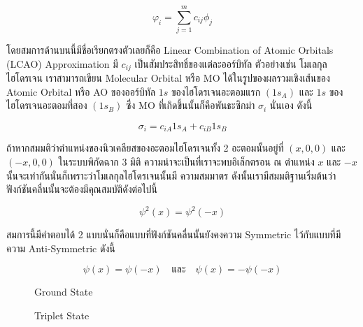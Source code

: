 \begin{equation}
  \label{eq:LCAO}
  \varphi_i = \sum_{j=1}^m c_{i j} \phi_j
\end{equation}

\noindent โดยสมการด้านบนนี้มีชื่อเรียกตรงตัวเลยก็คือ Linear Combination of Atomic Orbitals (LCAO) Approximation
มี $c_{i j}$ เป็นสัมประสิทธิ์ของแต่ละออร์บิทัล ตัวอย่างเช่น โมเลกุลไฮโดรเจน  เราสามารถเขียน Molecular Orbital หรือ MO
ได้ในรูปของผลรวมเชิงเส้นของ Atomic Orbital หรือ AO ของออร์บิทัล $1 s$ ของไฮโดรเจนอะตอมแรก $(1 s_A)$ และ $1 s$
ของไฮโดรเจนอะตอมที่สอง $(1 s_B)$ ซึ่ง MO ที่เกิดขึ้นนั้นก็คือพันธะซิกม่า $\sigma_i$ นั่นเอง ดังนี้

\begin{equation}
  \sigma_i = c_{i A} 1 s_A+c_{i B} 1 s_B
\end{equation}

ถ้าหากสมมติว่าตำแหน่งของนิวเคลียสของอะตอมไฮโดรเจนทั้ง 2 อะตอมนั้นอยู่ที่ $\left(x, 0,0\right)$ และ $\left(-x, 0,0\right)$
ในระบบพิกัดฉาก 3 มิติ ความน่าจะเป็นที่เราจะพบอิเล็กตรอน ณ ตำแหน่ง $x$ และ $-x$ นั้นจะเท่ากันนั่นก็เพราะว่าโมเลกุลไฮโดรเจนนั้นมี%
ความสมมาตร ดังนั้นเรามีสมมติฐานเริ่มต้นว่าฟังก์ชันคลื่นนั้นจะต้องมีคุณสมบัติดังต่อไปนี้

\begin{equation}
  \psi^2(x) = \psi^2(-x)
\end{equation}

\noindent สมการนี้มีคำตอบได้ 2 แบบนั่นก็คือแบบที่ฟังก์ชันคลื่นนั้นยังคงความ Symmetric ไว้กับแบบที่มีความ Anti-Symmetric ดังนี้

\begin{equation}
  \psi(x) = \psi(-x)
  \quad \text{และ} \quad
  \psi(x) = -\psi(-x)
\end{equation}

\begin{figure}[htbp]
  \label{fig:MO_H2_ground}
  \centering
  \begin{MOdiagram}[names,style=square]
  \end{MOdiagram}
  \caption{Ground State}
\end{figure}

\begin{figure}[htbp]
  \label{fig:MO_H2_triplet}
  \centering
  \begin{MOdiagram}[names,style=square]
  \end{MOdiagram}
  \caption{Triplet State}
\end{figure}

